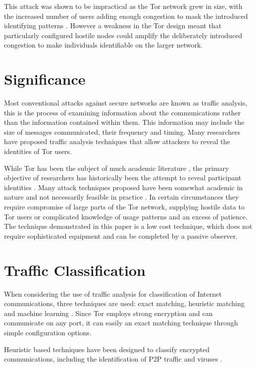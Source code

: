 \documentclass[conference]{IEEEtran}
\begin{document}
This attack was shown to be impractical as the Tor network grew in size, with
the increased number of users adding enough congestion to mask the introduced
identifying patterns \parencite{Evans:2009p315}. However a weakness in the Tor
design meant that particularly configured hostile nodes could amplify the
deliberately introduced congestion to make individuals identifiable on the
larger network.

\section{Significance}

Most conventional attacks against secure networks are known as traffic analysis,
this is the process of examining information about the communications rather
than the information contained within them. This information may include the
size of messages communicated, their frequency and timing. Many researchers have
proposed traffic analysis techniques that allow attackers to reveal the
identities of Tor users.

While Tor has been the subject of much academic literature
\parencite{Hopper:2007p347,Murdoch:2007p320,Herrmann:2009p1189}, the primary
objective of researchers has historically been the attempt to reveal
participant identities \parencite[3]{Murdoch:2005p325}.  Many attack techniques
proposed have been somewhat academic in nature and not necessarily feasible in
practice \parencite{Raccoon:2008fk}. In certain circumstances they require
compromise of large parts of the Tor network, supplying hostile data to Tor
users or complicated knowledge of usage patterns and an excess of patience. The
technique demonstrated in this paper is a low cost technique, which does not
require sophisticated equipment and can be completed by a passive observer.

\section{Traffic Classification}

When considering the use of traffic analysis for classification of Internet
communications, three techniques are used: exact matching, heuristic matching
and machine learning \parencite{Zhang:2009p1188}. Since Tor employs strong
encryption and can communicate on any port, it can easily an exact matching
technique through simple configuration options.

Heuristic based techniques have been designed to classify encrypted
communications, including the identification of P2P traffic
\parencite{Karagiannis:2004p6400,Perenyi:2006p6325,John:2008p1376} and viruses
\parencite{Lazarevic:2003p6450}.
\end{document}
